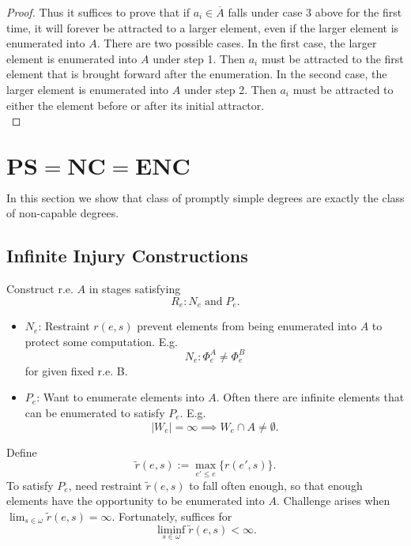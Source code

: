 \documentclass{article}
\begin{document}
\begin{proof}
    Thus it suffices to prove that if $a_i\in\overline{A}$ falls under case
    3 above for the first time, it will forever be attracted to a larger
    element, even if the larger element is enumerated into $A$. There are
    two possible cases. In the first case, the larger element is enumerated
    into $A$ under step 1. Then $a_i$ must be attracted to the first
    element that is brought forward after the enumeration. In the second
    case, the larger element is enumerated into $A$ under step 2. Then
    $a_i$ must be attracted to either the element before or after its
    initial attractor. \\
  \end{proof}

\section{$\bm{PS}=\bm{NC}=\bm{ENC}$}
  In this section we show that class of promptly simple degrees are exactly
  the class of non-capable degrees.

\subsection{Infinite Injury Constructions}
  \label{section:infinite-injury}
  Construct r.e. $A$ in stages satisfying
  \[R_e: N_e\; \text{and}\; P_e.\]
  \begin{itemize}
    \item $N_e$: Restraint $r(e,s)$ prevent elements from being enumerated
      into $A$ to protect some computation. E.g.
      \[N_e: \Phi_e^A\neq \Phi_e^B\]
      for given fixed r.e. B.

    \item $P_e$: Want to enumerate elements into $A$. Often there are
      infinite elements that can be enumerated to satisfy $P_e$. E.g.
      \[|W_e|=\infty \implies W_e\cap A\neq\emptyset.\]
  \end{itemize}

  Define
  \[\tilde{r}(e,s) :=\max_{e'\leq e}\{r(e',s)\}.\]
  To satisfy $P_e$, need restraint $\tilde{r}(e,s)$ to fall often enough,
  so that enough elements have the opportunity to be enumerated into $A$.
  Challenge arises when $\lim_{s\in\omega}\tilde{r}(e,s)=\infty$.
  Fortunately, suffices for
  \begin{equation}
    \liminf_{s\in\omega}\tilde{r}(e,s)<\infty.
    \label{eqn:liminf}
  \end{equation}
\end{document}
